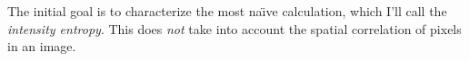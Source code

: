 \documentclass[../notebook.tex]{subfiles}
\begin{document}

The initial goal is to characterize the most na{\"\i}ve calculation, which I'll
call the \emph{intensity entropy}. This does \emph{not} take into account the
spatial correlation of pixels in an image.



\end{document}
